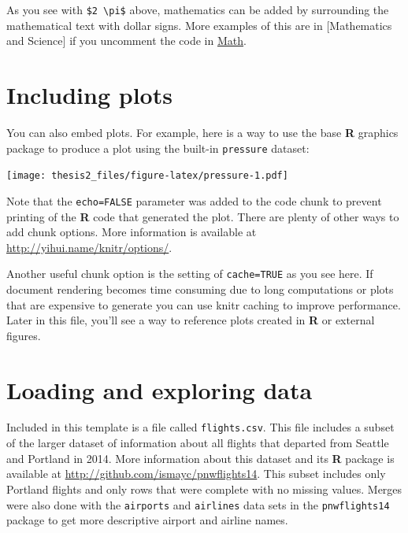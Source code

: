 \documentclass[twoside,12pt,final]{ucthesis-CA2012}
\begin{document}
\begin{ucmainmatter}
As you see with \texttt{\$2\ \textbackslash{}pi\$} above, mathematics can be added by surrounding the mathematical text with dollar signs. More examples of this are in {[}Mathematics and Science{]} if you uncomment the code in \protect\hyperlink{math}{Math}.

\hypertarget{including-plots}{%
\section{Including plots}\label{including-plots}}

You can also embed plots. For example, here is a way to use the base \textbf{R} graphics package to produce a plot using the built-in \texttt{pressure} dataset:

\texttt{[image: thesis2\_files/figure-latex/pressure-1.pdf]}

Note that the \texttt{echo=FALSE} parameter was added to the code chunk to prevent printing of the \textbf{R} code that generated the plot. There are plenty of other ways to add chunk options. More information is available at \url{http://yihui.name/knitr/options/}.

Another useful chunk option is the setting of \texttt{cache=TRUE} as you see here. If document rendering becomes time consuming due to long computations or plots that are expensive to generate you can use knitr caching to improve performance. Later in this file, you'll see a way to reference plots created in \textbf{R} or external figures.

\hypertarget{loading-and-exploring-data}{%
\section{Loading and exploring data}\label{loading-and-exploring-data}}

Included in this template is a file called \texttt{flights.csv}. This file includes a subset of the larger dataset of information about all flights that departed from Seattle and Portland in 2014. More information about this dataset and its \textbf{R} package is available at \url{http://github.com/ismayc/pnwflights14}. This subset includes only Portland flights and only rows that were complete with no missing values. Merges were also done with the \texttt{airports} and \texttt{airlines} data sets in the \texttt{pnwflights14} package to get more descriptive airport and airline names.


\end{ucmainmatter}
\end{document}
